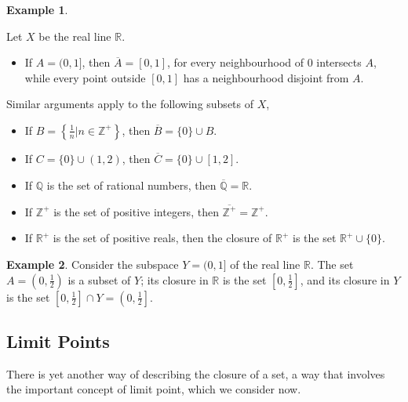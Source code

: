 \documentclass[
]{book}
\providecommand{\tightlist}{%
  \setlength{\itemsep}{0pt}\setlength{\parskip}{0pt}}
\theoremstyle{definition}
\theoremstyle{definition}
\newtheorem{example}{Example}[chapter]
\theoremstyle{definition}
\theoremstyle{definition}
\theoremstyle{remark}
\begin{document}
\begin{example}
\protect\hypertarget{exm:e1}{}\label{exm:e1}

Let \(X\) be the real line \(\mathbb{R}\).

\begin{itemize}
\tightlist
\item
  If \(A = (0, 1]\), then \(\overline{A} = [0, 1]\), for every neighbourhood of 0 intersects \(A\), while every point outside \([0, 1]\) has a neighbourhood disjoint from \(A\).
\end{itemize}

Similar arguments apply to the following subsets of \(X\),

\begin{itemize}
\item
  If \(B = \left\{\frac{1}{n} | n \in \mathbb{Z}^{+}\right\}\), then \(\overline{B} = \{0\} \cup B\).
\item
  If \(C = \{0\} \cup (1, 2)\), then \(\overline{C} = \{0\}\cup[1, 2]\).
\item
  If \(\mathbb{Q}\) is the set of rational numbers, then \(\overline{\mathbb{Q}} = \mathbb{R}\).
\item
  If \(\mathbb{Z}^{+}\) is the set of positive integers, then \(\overline{\mathbb{Z}^{+}} = \mathbb{Z}^{+}\).
\item
  If \(\mathbb{R}^{+}\) is the set of positive reals, then the closure of \(\mathbb{R}^{+}\) is the set \(\mathbb{R}^{+} \cup \{0\}\).
\end{itemize}

\end{example}

\begin{example}
\protect\hypertarget{exm:unnamed-chunk-69}{}\label{exm:unnamed-chunk-69}Consider the subspace \(Y = (0, 1]\) of the real line \(\mathbb{R}\). The set \(A = \left(0, \frac{1}{2}\right)\) is a subset of \(Y\); its closure in \(\mathbb{R}\) is the set \(\left[0, \frac{1}{2}\right]\), and its closure in \(Y\) is the set \(\left[0, \frac{1}{2}\right] \cap Y = \left(0, \frac{1}{2}\right]\).
\end{example}

\hypertarget{limit-points}{%
\subsection{Limit Points}\label{limit-points}}

There is yet another way of describing the closure of a set, a way that involves the important concept of limit point, which we consider now.
\end{document}
